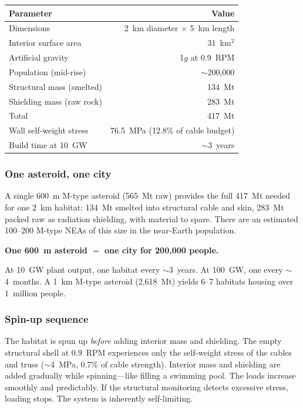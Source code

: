 \documentclass[12pt,letterpaper]{article}
\begin{document}
\begin{center}
\small
\begin{tabular}{lr}
\toprule
\textbf{Parameter} & \textbf{Value} \\
\midrule
Dimensions & 2~km diameter $\times$ 5~km length \\
Interior surface area & 31~km$^2$ \\
Artificial gravity & 1$g$ at 0.9~RPM \\
Population (mid-rise) & $\sim$200,000 \\
Structural mass (smelted) & 134~Mt \\
Shielding mass (raw rock) & 283~Mt \\
Total & 417~Mt \\
Wall self-weight stress & 76.5~MPa (12.8\% of cable budget) \\
Build time at 10~GW & $\sim$3~years \\
\bottomrule
\end{tabular}
\end{center}

\subsubsection{One asteroid, one city}

A single 600~m M-type asteroid (565~Mt raw) provides the full 417~Mt needed for one 2~km habitat: 134~Mt smelted into structural cable and skin, 283~Mt packed raw as radiation shielding, with material to spare. There are an estimated 100--200 M-type NEAs of this size in the near-Earth population.

\begin{center}
\textbf{One 600~m asteroid $=$ one city for 200,000 people.}
\end{center}

At 10~GW plant output, one habitat every $\sim$3~years. At 100~GW, one every $\sim$4~months. A 1~km M-type asteroid (2,618~Mt) yields 6--7 habitats housing over 1~million people.

\subsubsection{Spin-up sequence}

The habitat is spun up \emph{before} adding interior mass and shielding. The empty structural shell at 0.9~RPM experiences only the self-weight stress of the cables and truss ($\sim$4~MPa, 0.7\% of cable strength). Interior mass and shielding are added gradually while spinning---like filling a swimming pool. The loads increase smoothly and predictably. If the structural monitoring detects excessive stress, loading stops. The system is inherently self-limiting.
\end{document}
